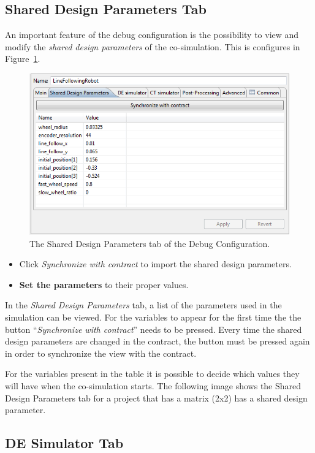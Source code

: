 \documentclass{crescendorepchap}
\begin{document}
\subsection{Shared Design Parameters Tab}

An important feature of the debug configuration is the possibility to
view and modify the \emph{shared design
parameters} of the co-simulation. This is configures in Figure~\ref{fig:sdpindebug}. 

\begin{figure}[htbp]
\centering
\includegraphics[width=.6\textwidth]{images/DestecsDebugConfigurationSDP.png}
\caption{The Shared Design Parameters tab of the Debug Configuration.\label{fig:sdpindebug}}
\end{figure}

\begin{itemize}
\item
  Click \emph{Synchronize with contract} to import the shared design
  parameters.
\item
  \textbf{Set the parameters} to their proper values.
\end{itemize}

In the \emph{Shared Design Parameters} tab, a list of the parameters used in
the simulation can be viewed. For the variables to appear for the first
time the the button ``\emph{Synchronize with contract}'' needs to be pressed.
Every time the shared design parameters are changed in the contract, the
button must be pressed again in order to synchronize the view with the
contract.

For the variables present in the table
it is possible to decide which values they will have when the
co-simulation starts. The following image shows the Shared Design
Parameters tab for a project that has a matrix (2x2) has a shared design
parameter.

\subsection{DE Simulator Tab}
\end{document}

